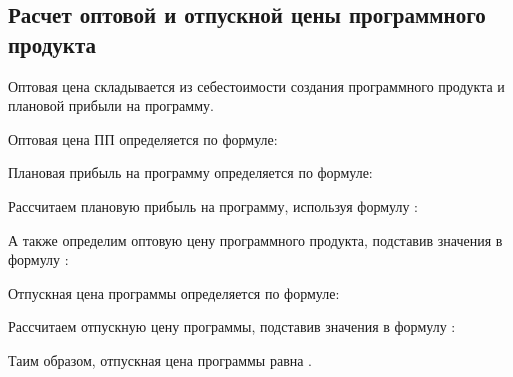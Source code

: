 \subsection{Расчет оптовой и отпускной цены программного продукта}
\label{sec:economics:ppoptcost}

Оптовая цена складывается из себестоимости создания программного продукта и плановой прибыли на программу.

Оптовая цена ПП определяется по формуле:
\ppOptPriceEquation

Плановая прибыль на программу определяется по формуле:
\plannedSoftIncomeEquation

Рассчитаем плановую прибыль на программу, используя формулу :
\plannedSoftIncomeFormulaApplied

А также определим оптовую цену программного продукта, подставив значения в формулу :
\ppOptPriceFormulaApplied

Отпускная цена программы определяется по формуле:
\ppResultCostEquation

Рассчитаем отпускную цену программы, подставив значения в формулу :
\ppResultCostFormulaApplied

Таим образом, отпускная цена программы равна \ppResultCostValue \ye.